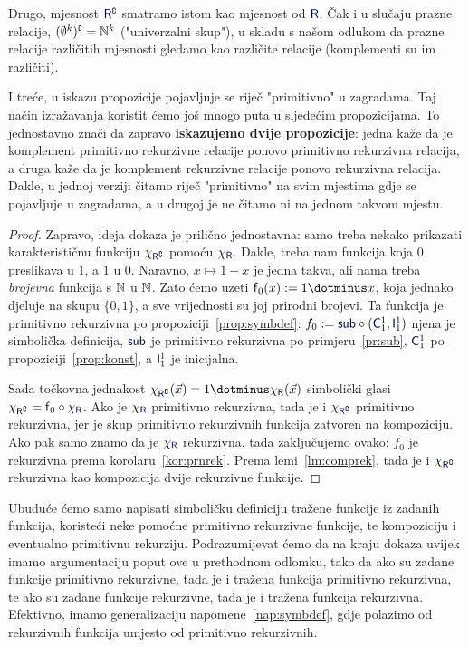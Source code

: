 Drugo, mjesnost  $\f R\kompl$ smatramo istom kao mjesnost od $\f R$. Čak i u slučaju prazne relacije, $(\emptyset^k)\sp{{\scriptscriptstyle\complement}}={\mathbb N}^k$ ("univerzalni skup"), u skladu s našom odlukom da prazne relacije različitih mjesnosti gledamo kao različite relacije (komplementi su im različiti).

I treće, u iskazu propozicije pojavljuje se riječ "primitivno" u zagradama. Taj način izražavanja koristit ćemo još mnogo puta u sljedećim propozicijama. To jednostavno znači da zapravo \textbf{iskazujemo dvije propozicije}: jedna kaže da je komplement primitivno rekurzivne relacije ponovo primitivno rekurzivna relacija, a druga kaže da je komplement rekurzivne relacije ponovo rekurzivna relacija. Dakle, u jednoj verziji čitamo riječ "primitivno" na svim mjestima gdje se pojavljuje u zagradama, a u drugoj je ne čitamo ni na jednom takvom mjestu.

\begin{proof}
Zapravo, ideja dokaza je prilično jednostavna: samo treba nekako prikazati karakterističnu funkciju $\chi_{\f R\kompl}$ pomoću $\chi_{\f R}$. Dakle, treba nam funkcija koja $0$ preslikava u $1$, a $1$ u $0$. Naravno, $x\mapsto1-x$ je jedna takva, ali nama treba \emph{brojevna} funkcija s ${\mathbb N}$ u ${\mathbb N}$. Zato ćemo uzeti $\f f_0(x):=1\dotminus x$, koja jednako djeluje na skupu $\{0,1\}$, a sve vrijednosti su joj prirodni brojevi. Ta funkcija je primitivno rekurzivna po propoziciji~\ref{prop:symbdef}: $f_0:=\f{sub}\circ(\f C_1^1,\f I_1^1)$ njena je simbolička definicija, $\f{sub}$ je primitivno rekurzivna po primjeru~\ref{pr:sub}, $\f C_1^1$ po propoziciji~\ref{prop:konst}, a $\f I_1^1$ je inicijalna.

Sada točkovna jednakost $\chi_{\f R\kompl}(\vec x)=1\dotminus\chi_{\f R}(\vec x)$ simbolički glasi $\chi_{\f R\kompl}=\f f_0\circ\chi_{\f R}$. Ako je $\chi_{\f R}$ primitivno rekurzivna, tada je i $\chi_{\f R\kompl}$ primitivno rekurzivna, jer je skup primitivno rekurzivnih funkcija zatvoren na kompoziciju.
Ako pak samo znamo da je $\chi_{\f R}$ rekurzivna, tada zaključujemo ovako: $f_0$ je rekurzivna prema korolaru~\ref{kor:prnrek}. Prema lemi~\ref{lm:comprek}, tada je i $\chi_{\f R\kompl}$ rekurzivna kao kompozicija dvije rekurzivne funkcije.
\end{proof}

Ubuduće ćemo samo napisati simboličku definiciju tražene funkcije iz zadanih funkcija, koristeći neke pomoćne primitivno rekurzivne funkcije, te kompoziciju i eventualno primitivnu rekurziju. Podrazumijevat ćemo da na kraju dokaza uvijek imamo argumentaciju poput ove u prethodnom odlomku, tako da ako su zadane funkcije primitivno rekurzivne, tada je i tražena funkcija primitivno rekurzivna, te ako su zadane funkcije rekurzivne, tada je i tražena funkcija rekurzivna. Efektivno, imamo generalizaciju napomene~\ref{nap:symbdef}, gdje polazimo od rekurzivnih funkcija umjesto od primitivno rekurzivnih.


